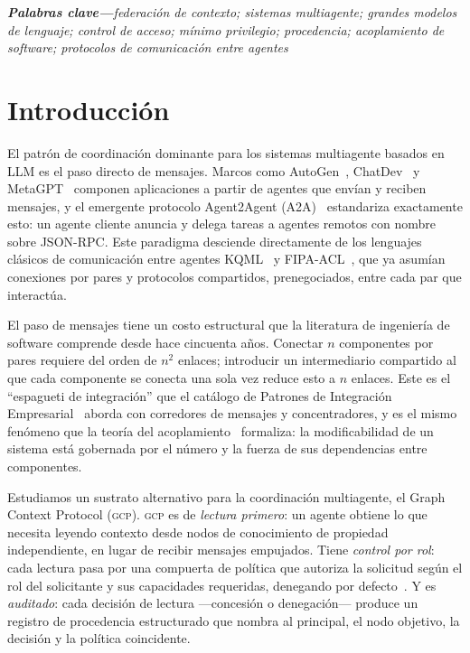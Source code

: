 \documentclass[10pt,twocolumn,letterpaper]{article}
\newcommand{\gcp}{\textsc{gcp}}
\begin{document}
\smallskip
\noindent\textbf{\textit{Palabras clave---}}\textit{federación de contexto;
sistemas multiagente; grandes modelos de lenguaje; control de acceso; mínimo
privilegio; procedencia; acoplamiento de software; protocolos de comunicación
entre agentes}
\smallskip

\section{Introducción}

El patrón de coordinación dominante para los sistemas multiagente basados en LLM
es el paso directo de mensajes. Marcos como AutoGen~\citep{wu2023autogen},
ChatDev~\citep{qian2024chatdev} y MetaGPT~\citep{hong2024metagpt} componen
aplicaciones a partir de agentes que envían y reciben mensajes, y el emergente
protocolo Agent2Agent (A2A)~\citep{a2a2025} estandariza exactamente esto: un
agente cliente anuncia y delega tareas a agentes remotos con nombre sobre
JSON-RPC. Este paradigma desciende directamente de los lenguajes clásicos de
comunicación entre agentes KQML~\citep{finin1994} y FIPA-ACL~\citep{fipa2002},
que ya asumían conexiones por pares y protocolos compartidos, prenegociados,
entre cada par que interactúa.

El paso de mensajes tiene un costo estructural que la literatura de ingeniería de
software comprende desde hace cincuenta años. Conectar $n$ componentes por pares
requiere del orden de $n^2$ enlaces; introducir un intermediario compartido al
que cada componente se conecta una sola vez reduce esto a $n$ enlaces. Este es el
``espagueti de integración'' que el catálogo de Patrones de Integración
Empresarial~\citep{hohpe2003} aborda con corredores de mensajes y concentradores,
y es el mismo fenómeno que la teoría del
acoplamiento~\citep{parnas1972,stevens1974,briand1999} formaliza: la
modificabilidad de un sistema está gobernada por el número y la fuerza de sus
dependencias entre componentes.

Estudiamos un sustrato alternativo para la coordinación multiagente, el Graph
Context Protocol (\gcp{}). \gcp{} es de \emph{lectura primero}: un agente obtiene
lo que necesita leyendo contexto desde nodos de conocimiento de propiedad
independiente, en lugar de recibir mensajes empujados. Tiene \emph{control por
rol}: cada lectura pasa por una compuerta de política que autoriza la solicitud
según el rol del solicitante y sus capacidades requeridas, denegando por
defecto~\citep{saltzer1975,sandhu1996}. Y es \emph{auditado}: cada decisión de
lectura ---concesión o denegación--- produce un registro de procedencia
estructurado que nombra al principal, el nodo objetivo, la decisión y la política
coincidente.
\end{document}
